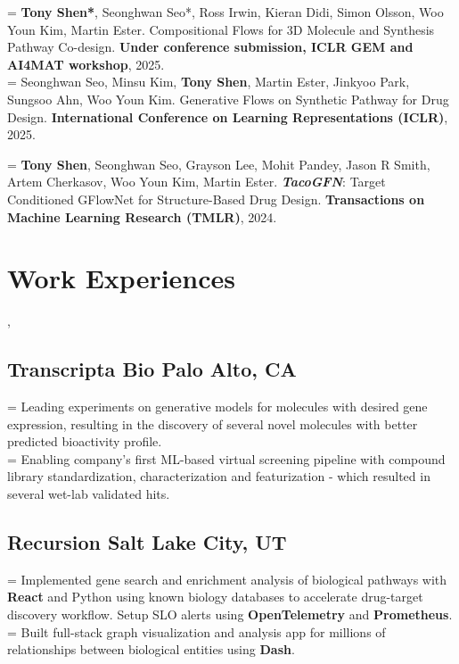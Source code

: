 \documentclass[]{Keval-resume}
\newlength\boxwid%
\let\oldtextbullet=\textbullet
\def\textbullet{%
    \settowidth{\boxwid}{\indent\oldtextbullet\ }%
    \hangindent=\boxwid%
    \oldtextbullet}
\begin{document}
\textbullet{} \textbf{Tony Shen*}, Seonghwan Seo*, Ross Irwin, Kieran Didi, Simon Olsson, Woo Youn Kim, Martin Ester. Compositional Flows for 3D Molecule and Synthesis Pathway Co-design. \textbf{Under conference submission, ICLR GEM and AI4MAT workshop}, 2025.
\\
\postsectionsep
\textbullet{} Seonghwan Seo, Minsu Kim, \textbf{Tony Shen}, Martin Ester, Jinkyoo Park, Sungsoo Ahn, Woo Youn Kim. Generative Flows on Synthetic Pathway for Drug Design. \textbf{International Conference on Learning Representations (ICLR)}, 2025. \\
\postsectionsep

\textbullet{} \textbf{Tony Shen}, Seonghwan Seo, Grayson Lee, Mohit Pandey, Jason R Smith, Artem Cherkasov, Woo Youn Kim, Martin Ester. \textit{\textbf{TacoGFN}}: Target Conditioned GFlowNet for Structure-Based Drug Design. \textbf{Transactions on Machine Learning Research (TMLR)}, 2024. \\
\postsectionsep



\section{Work Experiences} 
\sep
\hrulefill
\postsectionsep 

\subsection{{Transcripta Bio} \hfill \normalfont Palo Alto, CA}
\textbullet{} Leading experiments on generative models for molecules with desired gene expression, resulting in the discovery of several novel molecules with better predicted bioactivity profile. \\
\textbullet{} Enabling company's first ML-based virtual screening pipeline with compound library standardization, characterization and featurization - which resulted in several wet-lab validated hits. 

\sectionsep

\subsection{{Recursion} \hfill \normalfont Salt Lake City, UT}
\textbullet{} Implemented gene search and enrichment analysis of biological pathways with \textbf{React} and Python using known biology databases to accelerate drug-target discovery workflow. Setup SLO alerts using \textbf{OpenTelemetry} and \textbf{Prometheus}.\\ 
\textbullet{} Built full-stack graph visualization and analysis app for millions of relationships between biological entities using \textbf{Dash}. \\
\sectionsep
\end{document}
